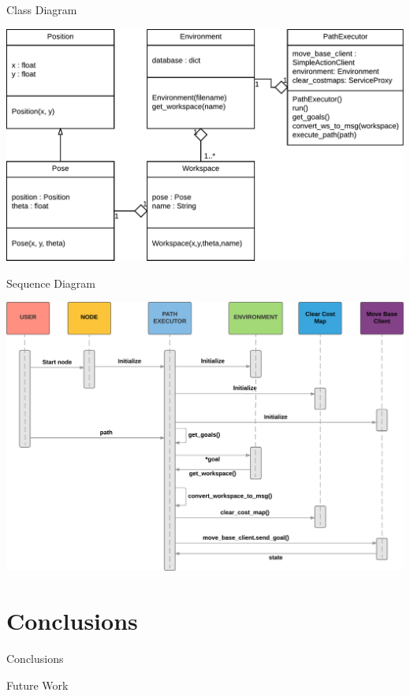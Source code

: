 \documentclass[12pt,aspectratio=43,xcolor={usenames,dvipsnames,table}]{beamer}
\begin{document}
\begin{frame}{Class Diagram}
    \begin{center}
        \includegraphics[width=\linewidth,height=0.9\textheight,keepaspectratio]{gfx/01.pdf}
    \end{center}
\end{frame}


\begin{frame}{Sequence Diagram}
    \begin{center}
        \includegraphics[width=\linewidth,height=0.9\textheight,keepaspectratio]{gfx/02.pdf}
    \end{center}
\end{frame}

\section{Conclusions}
\begin{frame}{Conclusions}
\end{frame}
\begin{frame}{Future Work}
\end{frame}
\end{document}
